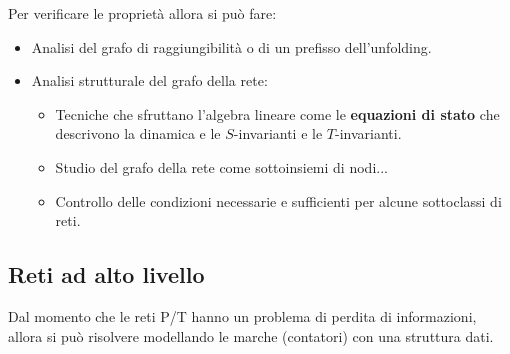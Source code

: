 Per verificare le proprietà allora si può fare:
\begin{itemize}
    \item Analisi del grafo di raggiungibilità o di un prefisso dell'unfolding.
    \item Analisi strutturale del grafo della rete:
          \begin{itemize}
              \item Tecniche che sfruttano l'algebra lineare come le \textbf{equazioni
                        di stato} che descrivono la dinamica e le $S$-invarianti
                    e le $T$-invarianti.
              \item Studio del grafo della rete come sottoinsiemi di nodi...
              \item Controllo delle condizioni necessarie e sufficienti per alcune
                    sottoclassi di reti.
          \end{itemize}
\end{itemize}
\subsection{Reti ad alto livello}
Dal momento che le reti P/T hanno un problema di perdita di informazioni, allora
si può risolvere modellando le marche (contatori) con una struttura dati.